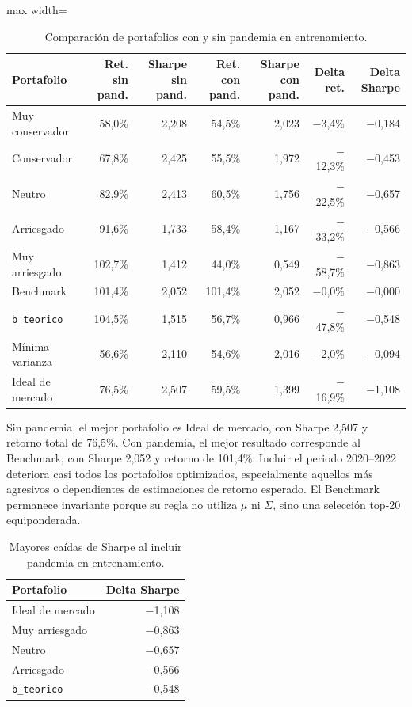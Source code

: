 \begin{table}[H]
\centering
\caption{Comparaci\'on de portafolios con y sin pandemia en entrenamiento.}
\label{tab:anexo4_comparacion_pandemia}
\scriptsize
\begin{adjustbox}{max width=\textwidth}
\begin{tabular}{@{}lrrrrrr@{}}
\toprule
Portafolio & Ret. sin pand. & Sharpe sin pand. & Ret. con pand. & Sharpe con pand. & Delta ret. & Delta Sharpe \\
\midrule
Muy conservador & 58,0\% & 2,208 & 54,5\% & 2,023 & $-$3,4\% & $-$0,184 \\
Conservador & 67,8\% & 2,425 & 55,5\% & 1,972 & $-$12,3\% & $-$0,453 \\
Neutro & 82,9\% & 2,413 & 60,5\% & 1,756 & $-$22,5\% & $-$0,657 \\
Arriesgado & 91,6\% & 1,733 & 58,4\% & 1,167 & $-$33,2\% & $-$0,566 \\
Muy arriesgado & 102,7\% & 1,412 & 44,0\% & 0,549 & $-$58,7\% & $-$0,863 \\
Benchmark & 101,4\% & 2,052 & 101,4\% & 2,052 & $-$0,0\% & $-$0,000 \\
\texttt{b\_teorico} & 104,5\% & 1,515 & 56,7\% & 0,966 & $-$47,8\% & $-$0,548 \\
M\'inima varianza & 56,6\% & 2,110 & 54,6\% & 2,016 & $-$2,0\% & $-$0,094 \\
Ideal de mercado & 76,5\% & 2,507 & 59,5\% & 1,399 & $-$16,9\% & $-$1,108 \\
\bottomrule
\end{tabular}
\end{adjustbox}
\end{table}

Sin pandemia, el mejor portafolio es Ideal de mercado, con Sharpe 2,507 y
retorno total de 76,5\%. Con pandemia, el mejor resultado corresponde al
Benchmark, con Sharpe 2,052 y retorno de 101,4\%. Incluir el periodo
2020--2022 deteriora casi todos los portafolios optimizados, especialmente
aquellos m\'as agresivos o dependientes de estimaciones de retorno esperado. El
Benchmark permanece invariante porque su regla no utiliza $\mu$ ni $\Sigma$,
sino una selecci\'on top-20 equiponderada.

\begin{table}[H]
\centering
\caption{Mayores ca\'idas de Sharpe al incluir pandemia en entrenamiento.}
\label{tab:anexo4_delta_sharpe}
\small
\begin{tabular}{@{}lr@{}}
\toprule
Portafolio & Delta Sharpe \\
\midrule
Ideal de mercado & $-$1,108 \\
Muy arriesgado & $-$0,863 \\
Neutro & $-$0,657 \\
Arriesgado & $-$0,566 \\
\texttt{b\_teorico} & $-$0,548 \\
\bottomrule
\end{tabular}
\end{table}

